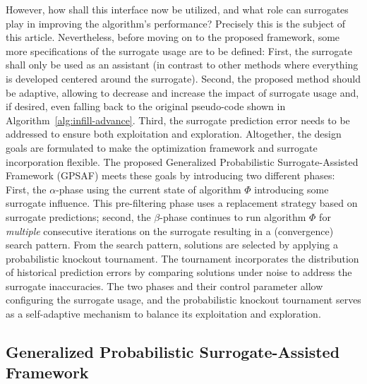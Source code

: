 \documentclass[journal]{IEEEtran}
\begin{document}
However, how shall this interface now be utilized, and what role can surrogates play in improving the algorithm's performance? Precisely this is the subject of this article. Nevertheless, before moving on to the proposed framework, some more specifications of the surrogate usage are to be defined: First, the surrogate shall only be used as an assistant (in contrast to other methods where everything is developed centered around the surrogate). Second, the proposed method should be adaptive, allowing to decrease and increase the impact of surrogate usage and, if desired, even falling back to the original pseudo-code shown in Algorithm~\ref{alg:infill-advance}. Third, the surrogate prediction error needs to be addressed to ensure both exploitation and exploration. Altogether, the design goals are formulated to make the optimization framework and surrogate incorporation flexible.
The proposed Generalized Probabilistic Surrogate-Assisted Framework (GPSAF) meets these goals by introducing two different phases: First, the $\alpha$-phase using the current state of algorithm $\Phi$ introducing some surrogate influence. This pre-filtering phase uses a replacement strategy based on surrogate predictions;
second, the $\beta$-phase continues to run algorithm $\Phi$ for \emph{multiple} consecutive iterations on the surrogate resulting in a (convergence) search pattern. From the search pattern, solutions are selected by applying a probabilistic knockout tournament. The tournament incorporates the distribution of historical prediction errors by comparing solutions under noise to address the surrogate inaccuracies. The two phases and their control parameter allow configuring the surrogate usage, and the probabilistic knockout tournament serves as a self-adaptive mechanism to balance its exploitation and exploration.     


\subsection{Generalized Probabilistic Surrogate-Assisted Framework}
\end{document}
